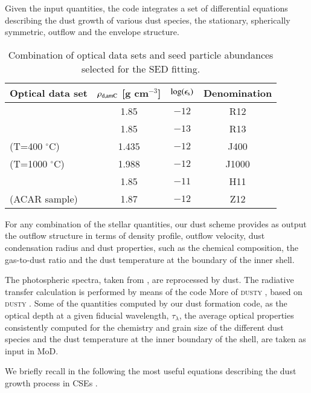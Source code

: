 \documentclass[useAMS,usenatbib]{mn2e/mn2e}
\begin{document}
Given the input quantities, the code integrates a set of differential equations describing the dust growth of various dust species, the stationary, spherically symmetric, outflow and the envelope structure.

\begin{table*}
\begin{center}
\caption{Combination of optical data sets and seed particle abundances selected for the SED fitting.}
\label{opt}
\begin{tabular}{l c c c}
\hline
Optical data set  & $\rho_{\rm d, amC}$ [g cm$^{-3}$]& $\log(\epsilon_{\rm s})$ &  Denomination \\
\hline
\citet{Rouleau91} & 1.85 & $-12$ & R12 \\
\citet{Rouleau91}  & 1.85 & $-13$ & R13 \\
\citet{Jaeger98} (T=400 $^\circ$C)  & 1.435 &$-12$ &  J400 \\
\citet{Jaeger98} (T=1000 $^\circ$C) & 1.988 &$-12$   &  J1000 \\
\citet{Hanner88} &  1.85 & $-11$ &   H11 \\
\citet{Zubko96} (ACAR sample) & 1.87 &$-12$ &  Z12\\
\hline
\end{tabular}
\end{center}
\end{table*}

For any combination of the stellar quantities, our dust scheme provides as output the outflow structure in terms of density profile, outflow velocity, dust condensation radius and dust properties, such as the chemical composition, the gas-to-dust ratio and the dust temperature at the boundary of the inner shell. 

The photospheric spectra, taken from \citet{Aringer16}, are reprocessed by dust. The radiative transfer calculation is performed by means of the code More of \textsc{dusty} \citep[MoD;][]{Groenewegen12}, based on \textsc{dusty} \citep{Ivezic97}. Some of the quantities computed by our dust formation code, as the optical depth at a given fiducial wavelength, $\tau_\lambda$, the average optical properties consistently computed for the chemistry and grain size of the different dust species and the dust temperature at the inner boundary of the shell, are taken as input in MoD.

We briefly recall in the following the most useful equations describing the dust growth process in CSEs \citep{Nanni13, Nanni14}.
\end{document}
